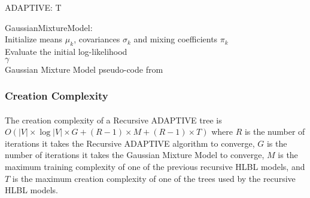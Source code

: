 \begin{algorithm}
\SetAlgoLined
ADAPTIVE:
\Return T
\end{algorithm}

\begin{algorithm} \label{code:GMM}
\SetAlgoLined
GaussianMixtureModel:
\\
Initialize means $\mu_k$, covariances $\sigma_k$ and mixing coefficients $\pi_k$
\\Evaluate the initial log-likelihood
\\
\Return $\gamma$
\\
Gaussian Mixture Model pseudo-code from \cite{Bishop2006}
\end{algorithm} 

\subsubsection{Creation Complexity}
\paragraph{}
The creation complexity of a Recursive ADAPTIVE tree is $O ( |V| \times \log|V| \times G + (R-1)\times M + (R-1)\times T)$ where $R$ is the number of iterations it takes the Recursive ADAPTIVE algorithm to converge, $G$ is the number of iterations it takes the Gaussian Mixture Model to converge, $M$ is the maximum training complexity of one of the previous recursive HLBL models, and $T$ is the maximum creation complexity of one of the trees used by the recursive HLBL models. 

